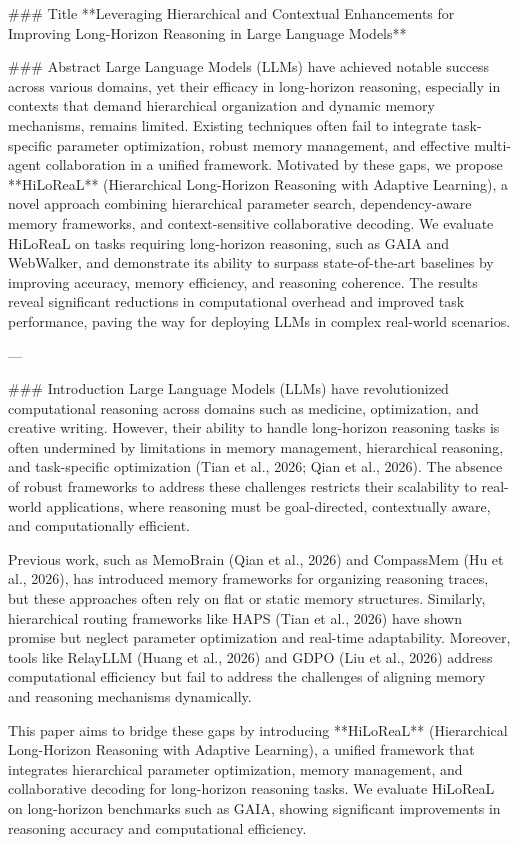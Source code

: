 ### Title
**Leveraging Hierarchical and Contextual Enhancements for Improving Long-Horizon Reasoning in Large Language Models**

### Abstract
Large Language Models (LLMs) have achieved notable success across various domains, yet their efficacy in long-horizon reasoning, especially in contexts that demand hierarchical organization and dynamic memory mechanisms, remains limited. Existing techniques often fail to integrate task-specific parameter optimization, robust memory management, and effective multi-agent collaboration in a unified framework. Motivated by these gaps, we propose **HiLoReaL** (Hierarchical Long-Horizon Reasoning with Adaptive Learning), a novel approach combining hierarchical parameter search, dependency-aware memory frameworks, and context-sensitive collaborative decoding. We evaluate HiLoReaL on tasks requiring long-horizon reasoning, such as GAIA and WebWalker, and demonstrate its ability to surpass state-of-the-art baselines by improving accuracy, memory efficiency, and reasoning coherence. The results reveal significant reductions in computational overhead and improved task performance, paving the way for deploying LLMs in complex real-world scenarios.

---

### Introduction
Large Language Models (LLMs) have revolutionized computational reasoning across domains such as medicine, optimization, and creative writing. However, their ability to handle long-horizon reasoning tasks is often undermined by limitations in memory management, hierarchical reasoning, and task-specific optimization (Tian et al., 2026; Qian et al., 2026). The absence of robust frameworks to address these challenges restricts their scalability to real-world applications, where reasoning must be goal-directed, contextually aware, and computationally efficient.

Previous work, such as MemoBrain (Qian et al., 2026) and CompassMem (Hu et al., 2026), has introduced memory frameworks for organizing reasoning traces, but these approaches often rely on flat or static memory structures. Similarly, hierarchical routing frameworks like HAPS (Tian et al., 2026) have shown promise but neglect parameter optimization and real-time adaptability. Moreover, tools like RelayLLM (Huang et al., 2026) and GDPO (Liu et al., 2026) address computational efficiency but fail to address the challenges of aligning memory and reasoning mechanisms dynamically.

This paper aims to bridge these gaps by introducing **HiLoReaL** (Hierarchical Long-Horizon Reasoning with Adaptive Learning), a unified framework that integrates hierarchical parameter optimization, memory management, and collaborative decoding for long-horizon reasoning tasks. We evaluate HiLoReaL on long-horizon benchmarks such as GAIA, showing significant improvements in reasoning accuracy and computational efficiency.


